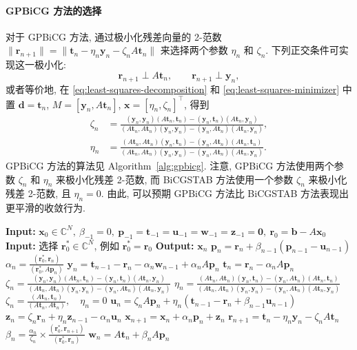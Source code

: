 \paragraph{{GPBiCG 方法的选择}}\label{subsec:gpbicg-parameter-choice}\mbox{}\par
{对于 GPBiCG 方法, 通过极小化残差向量的 2-范数 $\|\bm r_{n+1}\|=\|\bm t_n-\eta_n\bm y_n-\zeta_nA\bm t_n\|$ 来选择两个参数 $\eta_n$ 和 $\zeta_n$. 下列正交条件可实现这一极小化:}
\[\bm r_{n+1}\perp A\bm t_n,\qquad\bm r_{n+1}\perp\bm y_n,\]
{或者等价地, 在 \eqref{eq:least-squares-decomposition} 和 \eqref{eq:least-squares-minimizer} 中置 $\bm d=\bm t_n$, $M=[\bm y_n,A\bm t_n]$, $\bm x=[\eta_n,\zeta_n]^{\top}$, 得到}
\[\begin{aligned}\zeta_n&=\frac{(\bm y_n,\bm y_n)(A\bm t_n,\bm t_n)-(\bm y_n,\bm t_n)(A\bm t_n,\bm y_n)}{(A\bm t_n,A\bm t_n)(\bm y_n,\bm y_n)-(\bm y_n,A\bm t_n)(A\bm t_n,\bm y_n)},\\\eta_n&=\frac{(A\bm t_n,A\bm t_n)(\bm y_n,\bm t_n)-(\bm y_n,A\bm t_n)(A\bm t_n,\bm t_n)}{(A\bm t_n,A\bm t_n)(\bm y_n,\bm y_n)-(\bm y_n,A\bm t_n)(A\bm t_n,\bm y_n)}.\end{aligned}\]
{GPBiCG 方法的算法见 Algorithm\ \ref{alg:gpbicg}. 注意, GPBiCG 方法使用两个参数 $\zeta_n$ 和 $\eta_n$ 来极小化残差 2-范数, 而 BiCGSTAB 方法使用一个参数 $\zeta_n$ 来极小化残差 2-范数, 且 $\eta_n=0$. 由此, 可以预期 GPBiCG 方法比 BiCGSTAB 方法表现出更平滑的收敛行为.}
\begin{algorithm}[H]\caption{{GPBiCG 方法}}\label{alg:gpbicg}\begin{algorithmic}[1]
\Statex\textbf{Input:} $\bm x_0\in\mathbb C^N,\ \beta_{-1}=0,\ \bm p_{-1}=\bm t_{-1}=\bm u_{-1}=\bm w_{-1}=\bm z_{-1}=\bm0,\ \bm r_0=\bm b-A\bm x_0$
\Statex\textbf{Input:} {选择 $\bm r_0^{*}\in\mathbb C^N$, 例如 $\bm r_0^{*}=\bm r_0$}
\Statex\textbf{Output:} $\bm x_n$
\State $\bm p_n=\bm r_n+\beta_{n-1}(\bm p_{n-1}-\bm u_{n-1})$
\State $\alpha_n=\frac{(\bm r_0^{*},\bm r_n)}{(\bm r_0^{*},A\bm p_n)}$
\State $\bm y_n=\bm t_{n-1}-\bm r_n-\alpha_n\bm w_{n-1}+\alpha_nA\bm p_n$
\State $\bm t_n=\bm r_n-\alpha_nA\bm p_n$
\State $\zeta_n=\frac{(\bm y_n,\bm y_n)(A\bm t_n,\bm t_n)-(\bm y_n,\bm t_n)(A\bm t_n,\bm y_n)}{(A\bm t_n,A\bm t_n)(\bm y_n,\bm y_n)-(\bm y_n,A\bm t_n)(A\bm t_n,\bm y_n)}$
\State $\eta_n=\frac{(A\bm t_n,A\bm t_n)(\bm y_n,\bm t_n)-(\bm y_n,A\bm t_n)(A\bm t_n,\bm t_n)}{(A\bm t_n,A\bm t_n)(\bm y_n,\bm y_n)-(\bm y_n,A\bm t_n)(A\bm t_n,\bm y_n)}$
\State $\zeta_n=\frac{(A\bm t_n,\bm t_n)}{(A\bm t_n,A\bm t_n)},\quad\eta_n=0$
\EndIf
\State $\bm u_n=\zeta_nA\bm p_n+\eta_n(\bm t_{n-1}-\bm r_n+\beta_{n-1}\bm u_{n-1})$
\State $\bm z_n=\zeta_n\bm r_n+\eta_n\bm z_{n-1}-\alpha_n\bm u_n$
\State $\bm x_{n+1}=\bm x_n+\alpha_n\bm p_n+\bm z_n$
\State $\bm r_{n+1}=\bm t_n-\eta_n\bm y_n-\zeta_nA\bm t_n$
\State $\beta_n=\frac{\alpha_n}{\zeta_n}\times\frac{(\bm r_0^{*},\bm r_{n+1})}{(\bm r_0^{*},\bm r_n)}$
\State $\bm w_n=A\bm t_n+\beta_nA\bm p_n$
\EndFor\end{algorithmic}\end{algorithm}
